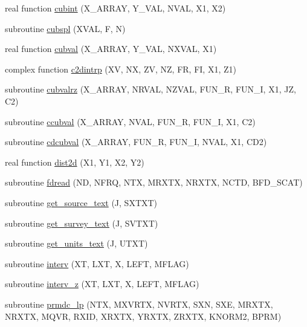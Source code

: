 \begin{DoxyCompactItemize}
\item 
real function \hyperlink{Leroi_8f90_aee021b0986763ff84e2a9373cd2c5b9f}{cubint} (X\+\_\+\+A\+R\+R\+AY, Y\+\_\+\+V\+AL, N\+V\+AL, X1, X2)
\item 
subroutine \hyperlink{Leroi_8f90_a836d1cb8acb3544a3a9fa63433efc1b6}{cubspl} (X\+V\+AL, F, N)
\item 
real function \hyperlink{Leroi_8f90_a7cfee47c046d9dadca7ccd1059bd30ac}{cubval} (X\+\_\+\+A\+R\+R\+AY, Y\+\_\+\+V\+AL, N\+X\+V\+AL, X1)
\item 
complex function \hyperlink{Leroi_8f90_ab444c66af8ac23d415864bbbd3ff9872}{c2dintrp} (XV, NX, ZV, NZ, FR, FI, X1, Z1)
\item 
subroutine \hyperlink{Leroi_8f90_a7ac3bb5f2b2d31402aa81424ee2be857}{cubvalrz} (X\+\_\+\+A\+R\+R\+AY, N\+R\+V\+AL, N\+Z\+V\+AL, F\+U\+N\+\_\+R, F\+U\+N\+\_\+I, X1, JZ, C2)
\item 
subroutine \hyperlink{Leroi_8f90_a5a4be24a4461d42dc9be5d5388c4d366}{ccubval} (X\+\_\+\+A\+R\+R\+AY, N\+V\+AL, F\+U\+N\+\_\+R, F\+U\+N\+\_\+I, X1, C2)
\item 
subroutine \hyperlink{Leroi_8f90_ab28d8a79c971f683b68fae4db0553909}{cdcubval} (X\+\_\+\+A\+R\+R\+AY, F\+U\+N\+\_\+R, F\+U\+N\+\_\+I, N\+V\+AL, X1, C\+D2)
\item 
real function \hyperlink{Leroi_8f90_a173fbca69518ee77703afb9c67d3e4f0}{dist2d} (X1, Y1, X2, Y2)
\item 
subroutine \hyperlink{Leroi_8f90_a51b5dc154d226d9db8556fde47af7ae9}{fdread} (ND, N\+F\+RQ, N\+TX, M\+R\+X\+TX, N\+R\+X\+TX, N\+C\+TD, B\+F\+D\+\_\+\+S\+C\+AT)
\item 
subroutine \hyperlink{Leroi_8f90_afc048db626c18fa128abba7a8c2100f6}{get\+\_\+source\+\_\+text} (J, S\+X\+T\+XT)
\item 
subroutine \hyperlink{Leroi_8f90_a602ef79dc6e8eaec1a5e258d5a385ae9}{get\+\_\+survey\+\_\+text} (J, S\+V\+T\+XT)
\item 
subroutine \hyperlink{Leroi_8f90_a5297bfa86ffada4b884da99673085b6a}{get\+\_\+units\+\_\+text} (J, U\+T\+XT)
\item 
subroutine \hyperlink{Leroi_8f90_ab3d44a77ee1868f9a09dcac7e6bfcdce}{interv} (XT, L\+XT, X, L\+E\+FT, M\+F\+L\+AG)
\item 
subroutine \hyperlink{Leroi_8f90_a94be7a783132491a0e0694c462d979b5}{interv\+\_\+z} (XT, L\+XT, X, L\+E\+FT, M\+F\+L\+AG)
\item 
subroutine \hyperlink{Leroi_8f90_a2332afca7e33269a0f374989bededf94}{prmdc\+\_\+lp} (N\+TX, M\+X\+V\+R\+TX, N\+V\+R\+TX, S\+XN, S\+XE, M\+R\+X\+TX, N\+R\+X\+TX, M\+Q\+VR, R\+X\+ID, X\+R\+X\+TX, Y\+R\+X\+TX, Z\+R\+X\+TX, K\+N\+O\+R\+M2, B\+P\+RM)

\end{DoxyCompactItemize}
